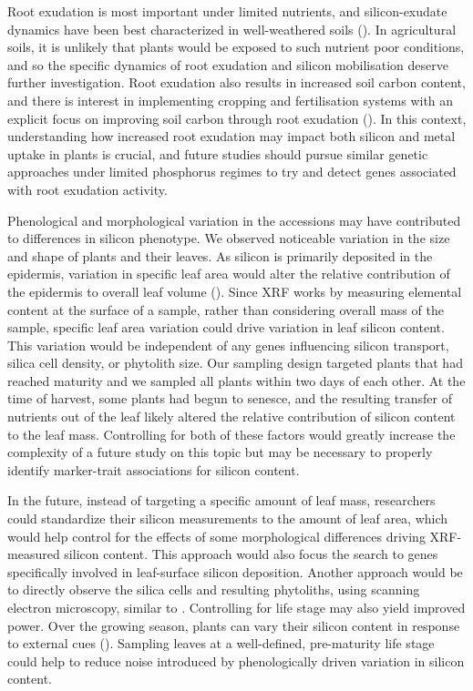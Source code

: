 \documentclass[12pt, letterpaper]{report}
\begin{document}
Root exudation is most important under limited nutrients, and silicon-exudate dynamics have been best characterized in well-weathered soils (\cite{lambers_plant_2008,de_tombeur_shift_2021,de_tombeur_silicon_2021-1}). In agricultural soils, it is unlikely that plants would be exposed to such nutrient poor conditions, and so the specific dynamics of root exudation and silicon mobilisation deserve further investigation. Root exudation also results in increased soil carbon content, and there is interest in implementing cropping and fertilisation systems with an explicit focus on improving soil carbon through root exudation (\cite{cornelis_soil_2022}). In this context, understanding how increased root exudation may impact both silicon and metal uptake in plants is crucial, and future studies should pursue similar genetic approaches under limited phosphorus regimes to try and detect genes associated with root exudation activity. 

Phenological and morphological variation in the accessions may have contributed to differences in silicon phenotype. We observed noticeable variation in the size and shape of plants and their leaves. As silicon is primarily deposited in the epidermis, variation in specific leaf area would alter the relative contribution of the epidermis to overall leaf volume (\cite{reidinger_rapid_2012}). Since XRF works by measuring elemental content at the surface of a sample, rather than considering overall mass of the sample, specific leaf area variation could drive variation in leaf silicon content. This variation would be independent of any genes influencing silicon transport, silica cell density, or phytolith size. Our sampling design targeted plants that had reached maturity and we sampled all plants within two days of each other. At the time of harvest, some plants had begun to senesce, and the resulting transfer of nutrients out of the leaf likely altered the relative contribution of silicon content to the leaf mass. Controlling for both of these factors would greatly increase the complexity of a future study on this topic but may be necessary to properly identify marker-trait associations for silicon content. 

In the future, instead of targeting a specific amount of leaf mass, researchers could standardize their silicon measurements to the amount of leaf area, which would help control for the effects of some morphological differences driving XRF-measured silicon content. This approach would also focus the search to genes specifically involved in leaf-surface silicon deposition. Another approach would be to directly observe the silica cells and resulting phytoliths, using scanning electron microscopy, similar to \textcite{waterman_short-term_2021-1}. Controlling for life stage may also yield improved power. Over the growing season, plants can vary their silicon content in response to external cues (\cite{hartley_ecology_2016}). Sampling leaves at a well-defined, pre-maturity life stage could help to reduce noise introduced by phenologically driven variation in silicon content. 
\end{document}
